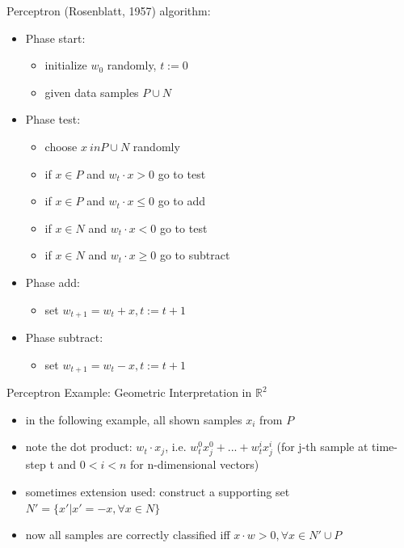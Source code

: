 \documentclass{beamer}
\begin{document}
\begin{frame}{Perceptron (Rosenblatt, 1957)}
algorithm:
\begin{itemize}
\item Phase start: 
  \begin{itemize}
  \item initialize $w_0$ randomly, $t:=0$
  \item given data samples $P\cup N$ 
  \end{itemize}
\item Phase test:
  \begin{itemize}
  	\item choose $x \ in P\cup N$ randomly
	\item if $x\in P$ and $w_t \cdot x > 0 $ go to test
    \item if $x\in P$ and $w_t \cdot x \leq 0 $ go to add
    \item if $x\in N$ and $w_t \cdot x < 0 $ go to test
    \item if $x\in N$ and $w_t \cdot x \geq 0 $ go to subtract
  \end{itemize}
\item Phase add:
  \begin{itemize}
  \item set $w_{t+1} = w_t + x, t:= t+1$
  \end{itemize}
\item Phase subtract:
  \begin{itemize}
  \item set $w_{t+1} = w_t - x, t:= t+1$
  \end{itemize}
\end{itemize}
\end{frame}


\begin{frame}{Perceptron Example: Geometric Interpretation in $\mathbb{R}^2$}
\begin{itemize}
\item in the following example, all shown samples $x_i$ from $P$
\item note the dot product: $w_t \cdot x_j$, i.e. $w^0_t x^0_j + ... + w^i_t x^i_j$
(for j-th sample at time-step t and $0 < i < n$ for n-dimensional vectors)
\item sometimes extension used: construct a supporting set $N' = \{x' | x' = -x, \forall x \in N\}$\\
\item now all samples are correctly classified iff $x \cdot w > 0, \forall x \in N' \cup P$
\end{itemize}
\end{frame}
\end{document}
